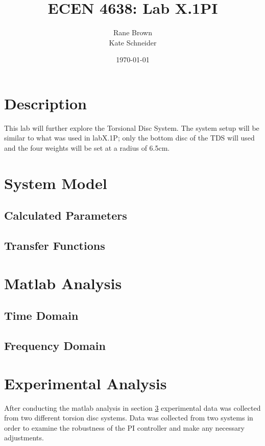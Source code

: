 \documentclass[11pt,titlepage]{article}
\author{Rane Brown \\ Kate Schneider}
\title{ECEN 4638: Lab X.1PI}
\date{\today}
\begin{document}
\maketitle
\tableofcontents
\listoffigures
\newpage

\section{Description}
    This lab will further explore the Torsional Disc System. The system setup will be similar to what was used in labX.1P; only the bottom disc of the TDS will used and the four weights will be set at a radius of 6.5cm.

\section{System Model}
    \subsection{Calculated Parameters}

    \subsection{Transfer Functions}

\section{Matlab Analysis}\label{sec:mat_anys}
    \subsection{Time Domain}

    \subsection{Frequency Domain}

\section{Experimental Analysis}
    After conducting the matlab analysis in section \ref{sec:mat_anys} experimental data was collected from two different torsion disc systems. Data was collected from two systems in order to examine the robustness of the PI controller and make any necessary adjustments.
\end{document}
